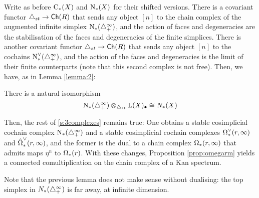 Write as before $\operatorname{C}_{*}(X)$ and $\operatorname{N}_{*}(X)$ for their shifted versions. There is a covariant functor $\triangle_{st}\to \mathsf{Ch}(R)$ that sends any object $[n]$ to the chain complex of the augmented infinite simplex $\operatorname{N}_{*}(\triangle_{+}^\infty)$, and the action of faces and degeneracies are the stabilisation of the faces and degeneracies of the finite simplices. There is another covariant functor $\triangle_{st}\to \mathsf{Ch}(R)$ that sends any object $[n]$ to the cochains $\operatorname{N}^\vee_{*}(\triangle_{+}^\infty)$, and the action of the faces and degeneracies is the limit of their finite counterparts (note that this second complex is not free). Then, we have, as in Lemma \ref{lemma:2}:

\begin{lemma}
    There is a natural isomorphism
\[
    \operatorname{N}_{*}(\triangle_{+}^{\infty})\otimes_{\triangle_{st}} \operatorname{L}(X)_\bullet \cong N_{*}(X)
\]
\end{lemma}

Then, the rest of \cref{s:3complexes} remains true: One obtains a stable cosimplicial cochain complex $\operatorname{N}_{*}(\triangle_{+}^\infty)$ and a stable cosimplicial cochain complexes $\operatorname{\Omega}^{\vee}_{*}(r,\infty)$ and $\hat{\operatorname{\Omega}}^{\vee}_{*}(r,\infty)$, and the former is the dual to a chain complex $\operatorname{\Omega}_{*}(r,\infty)$ that admits maps $\eta^{n}$ to $\operatorname{\Omega}_{*}(r)$. With these changes, Proposition \ref{prop:omegarm} yields a connected comultiplication on the chain complex of a Kan spectrum.

Note that the previous lemma does not make sense without dualising: the top simplex in $N_*(\triangle_{+}^\infty)$ is far away, at infinite dimension.



